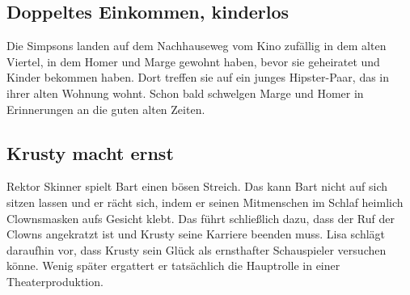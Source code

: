 
\subsection{Doppeltes Einkommen, kinderlos}\label{XABF06}
Die Simpsons landen auf dem Nachhauseweg vom Kino zufällig in dem alten Viertel, in dem Homer und Marge gewohnt haben, bevor sie geheiratet und Kinder bekommen haben. Dort treffen sie auf ein junges Hipster-Paar, das in ihrer alten Wohnung wohnt. Schon bald schwelgen Marge und Homer in Erinnerungen an die guten alten Zeiten.


\subsection{Krusty macht ernst}\label{XABF08}
Rektor Skinner spielt Bart einen bösen Streich. Das kann Bart nicht auf sich sitzen lassen und er rächt sich, indem er seinen Mitmenschen im Schlaf heimlich Clownsmasken aufs Gesicht klebt. Das führt schließlich dazu, dass der Ruf der Clowns angekratzt ist und Krusty seine Karriere beenden muss. Lisa schlägt daraufhin vor, dass Krusty sein Glück als ernsthafter Schauspieler versuchen könne. Wenig später ergattert er tatsächlich die Hauptrolle in einer Theaterproduktion.


